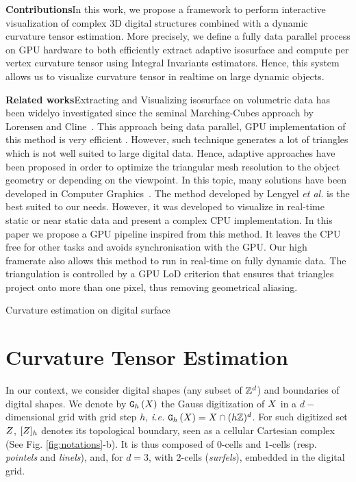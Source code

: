 \documentclass{llncs}
\begin{document}
\noindent\textbf{Contributions}\quad In this work, we propose a framework
to perform interactive visualization of complex 3D digital structures
combined with a dynamic curvature tensor estimation. More precisely,
we define a fully data parallel process on GPU hardware to both
efficiently extract adaptive isosurface and compute per vertex
curvature tensor using Integral Invariants estimators. Hence, this system
allows us to visualize curvature tensor in realtime on large dynamic
objects.


\noindent\textbf{Related works}\quad Extracting and Visualizing
isosurface on volumetric data has been widelyo investigated since the
seminal Marching-Cubes approach by Lorensen and
Cline~\cite{lorensen1987marching}. This approach being data parallel,
GPU implementation of this method is very efficient
\cite{tatarchuk2007real}. However, such technique generates a lot of
triangles which is not well suited to large digital data. Hence,
adaptive approaches have been proposed in order to optimize the
triangular mesh resolution to the object geometry or depending on the
viewpoint. In this topic, many solutions have been developed in
Computer
Graphics~\cite{shu1995adaptive,schaefer2004dual,lengyel2010voxel,DBLP:journals/cgf/LewinerMPPL10,DBLP:journals/cvgip/LobelloDD14}.
The method developed by Lengyel \textit{et al.}
\cite{lengyel2010voxel} is the best suited to our needs.  However, it
was developed to visualize in real-time static or near static data and
present a complex CPU implementation.  In this paper we propose a GPU
pipeline inspired from this method.  It leaves the CPU free for other
tasks and avoids synchronisation with the GPU.  Our high framerate
also allows this method to run in real-time on fully dynamic data.
The triangulation is controlled by a GPU LoD criterion that ensures
that triangles project onto more than one pixel, thus removing
geometrical aliasing.

Curvature estimation on digital surface



\section{Curvature Tensor Estimation}
\label{sec:curv-tens-estim}

\sloppy In our context, we consider digital shapes (any subset of ${\mathbb{Z}}^d$) and
boundaries of digital shapes. We denote by $\mathtt{G}_{h}\left(X\right)$ the Gauss
digitization of $X$ in a $d-$dimensional grid with grid step $h$,
\emph{i.e.}  $\mathtt{G}_{h}\left(X\right) = X \cap (h{\mathbb{Z}})^d$. For such digitized set
$Z$, $\lbrack Z \rbrack_{h}$  denotes its
topological boundary, seen as a cellular Cartesian complex (See
Fig. \ref{fig:notations}-b). It is thus composed of $0$-cells and
$1$-cells (resp. \emph{pointels} and \emph{linels}), and, for $d=3$,
with $2$-cells ({\em surfels}), embedded in the digital grid.
\end{document}
